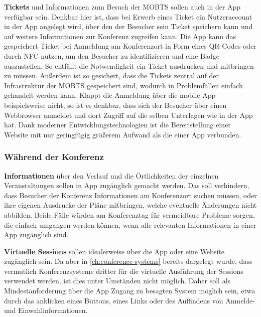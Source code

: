 \textbf{Tickets} und Informationen zum Besuch der \ac{MOBTS} sollen auch in der App verfügbar sein.
Denkbar hier ist, dass bei Erwerb eines Ticket ein Nutzeraccount in der App angelegt wird, über den der Besucher sein Ticket speichern kann und auf weitere Informationen zur Konferenz zugreifen kann.
Die App kann das gespeichert Ticket bei Anmeldung am Konferenzort in Form eines QR-Codes oder durch \ac{NFC} nutzen, um den Besucher zu identifizieren und eine Badge auszustellen.
So entfällt die Notwendigkeit ein Ticket ausdrucken und mitbringen zu müssen.
Außerdem ist so gesichert, dass die Tickets zentral auf der Infrastruktur der MOBTS gespeichert sind, wodurch in Problemfällen einfach gehandelt werden kann.
Klappt die Anmeldung über die mobile App beispielsweise nicht, so ist es denkbar, dass sich der Besucher über einen Webbrowser anmeldet und dort Zugriff auf die selben Unterlagen wie in der App hat.
Dank moderner Entwicklungstechnologien ist die Bereitstellung einer Website mit nur geringfügig größerem Aufwand als die einer App verbunden.

\subsubsection*{Während der Konferenz}
\textbf{Informationen} über den Verlauf und die Örtlichkeiten der einzelnen Veranstaltungen sollen in App zugänglich gemacht werden.
Das soll verhindern, dass Besucher der Konferenz Informationen am Konferenzort suchen müssen, oder ihre eigenen Ausdrucke der Pläne mitbringen, welche eventuelle Änderungen nicht abbilden.
Beide Fälle würden am Konferenztag für vermeidbare Probleme sorgen, die einfach umgangen werden können, wenn alle relevanten Informationen in einer App zugänglich sind.

\textbf{Virtuelle Sessions} sollen idealerweise über die App oder eine Website zugänglich sein. 
Da aber in \autoref{ch:conference-systems} bereits dargelegt wurde, dass vermutlich Konferenzsysteme dritter für die virtuelle Ausführung der Sessions verwendet werden, ist dies unter Umständen nicht möglich.
Daher soll als Mindestanforderung über die App Zugang zu besagten System möglich sein, etwa durch das anklicken eines Buttons, eines Links oder des Auffindens von Anmelde- und Einwahlinformationen.

